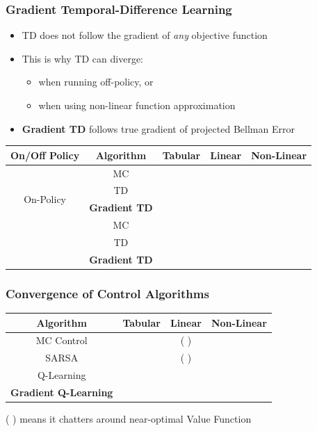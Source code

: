 \documentclass[handout]{beamer}
\newcommand{\cmark}{\ding{51}}%
\newcommand{\xmark}{\ding{55}}%
\begin{document}
\begin{frame}
\frametitle{Gradient Temporal-Difference Learning}
\pause
\begin{itemize}[<+->]
\item TD does not follow the gradient of {\em any} objective function
\item This is why TD can diverge:
\begin{itemize}[<+->]
\item when running off-policy, or
\item when using non-linear function approximation
\end{itemize}
\item {\bf Gradient TD} follows true gradient of projected Bellman Error
\end{itemize}
\pause
\begin{center}
      \begin{tabular}{ccccc}
      \hline
      On/Off Policy & Algorithm & Tabular & Linear & Non-Linear \\ \hline
      \multirow{4}{*}{On-Policy} & MC & \cmark & \cmark & \cmark \\
      & TD & \cmark & \cmark & \xmark \\
      & {\bf Gradient TD} & {\bf \cmark} & {\bf \cmark} & {\bf \cmark} \\ \hline
      \multirow{4}{*}{Off-Policy} & MC & \cmark & \cmark & \cmark \\
      & TD & \cmark & \xmark & \xmark \\
      & {\bf Gradient TD} & {\bf \cmark} & {\bf \cmark} & {\bf \cmark} \\ \hline
      \end{tabular} 
\end{center}      
\end{frame}

\begin{frame}
\frametitle{Convergence of Control Algorithms}
\pause
\begin{center}
      \begin{tabular}{cccc}
      \hline
      Algorithm & Tabular & Linear & Non-Linear \\ \hline
      MC Control & \cmark & ( \cmark ) & \xmark \\
      SARSA & \cmark & ( \cmark ) & \xmark \\ 
      Q-Learning & \cmark & \xmark & \xmark \\
      {\bf Gradient Q-Learning} & \cmark & \cmark & \xmark \\ \hline
      \end{tabular}
 \end{center}     
  \pause
  ( \cmark ) means it chatters around near-optimal Value Function   
\end{frame}
\end{document}
